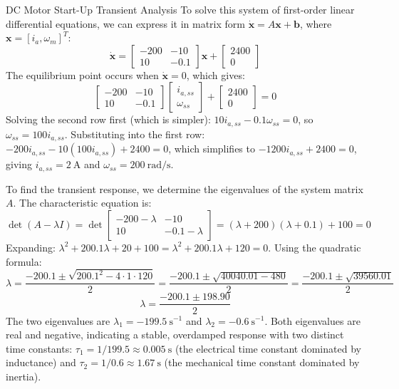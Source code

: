 \begin{example}{DC Motor Start-Up Transient Analysis}
To solve this system of first-order linear differential equations, we can express it in matrix form $\dot{\mathbf{x}} = A\mathbf{x} + \mathbf{b}$, where $\mathbf{x} = [i_a, \omega_m]^T$:
\begin{equation}
\dot{\mathbf{x}} = \begin{bmatrix} -200 & -10 \\ 10 & -0.1 \end{bmatrix} \mathbf{x} + \begin{bmatrix} 2400 \\ 0 \end{bmatrix}
\end{equation}
The equilibrium point occurs when $\dot{\mathbf{x}} = 0$, which gives:
\begin{equation}
\begin{bmatrix} -200 & -10 \\ 10 & -0.1 \end{bmatrix} \begin{bmatrix} i_{a,ss} \\ \omega_{ss} \end{bmatrix} + \begin{bmatrix} 2400 \\ 0 \end{bmatrix} = 0
\end{equation}
Solving the second row first (which is simpler): $10i_{a,ss} - 0.1\omega_{ss} = 0$, so $\omega_{ss} = 100i_{a,ss}$. Substituting into the first row: $-200i_{a,ss} - 10(100i_{a,ss}) + 2400 = 0$, which simplifies to $-1200i_{a,ss} + 2400 = 0$, giving $i_{a,ss} = 2\ \text{A}$ and $\omega_{ss} = 200\ \text{rad/s}$.

To find the transient response, we determine the eigenvalues of the system matrix $A$. The characteristic equation is:
\begin{equation}
\det(A - \lambda I) = \det\begin{bmatrix} -200 - \lambda & -10 \\ 10 & -0.1 - \lambda \end{bmatrix} = (\lambda + 200)(\lambda + 0.1) + 100 = 0
\end{equation}
Expanding: $\lambda^2 + 200.1\lambda + 20 + 100 = \lambda^2 + 200.1\lambda + 120 = 0$. Using the quadratic formula:
\begin{equation}
\lambda = \frac{-200.1 \pm \sqrt{200.1^2 - 4 \cdot 1 \cdot 120}}{2} = \frac{-200.1 \pm \sqrt{40040.01 - 480}}{2} = \frac{-200.1 \pm \sqrt{39560.01}}{2}
\end{equation}
\begin{equation}
\lambda = \frac{-200.1 \pm 198.90}{2}
\end{equation}
The two eigenvalues are $\lambda_1 = -199.5\ \text{s}^{-1}$ and $\lambda_2 = -0.6\ \text{s}^{-1}$. Both eigenvalues are real and negative, indicating a stable, overdamped response with two distinct time constants: $\tau_1 = 1/199.5 \approx 0.005\ \text{s}$ (the electrical time constant dominated by inductance) and $\tau_2 = 1/0.6 \approx 1.67\ \text{s}$ (the mechanical time constant dominated by inertia).


\end{example}
